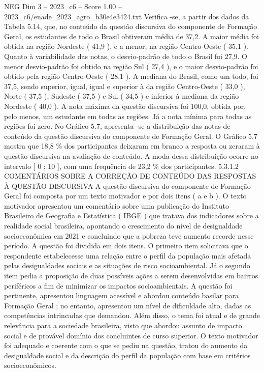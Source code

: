 \begin{textsample}{NEG Dim 3 – 2023\_c6 – Score 1.00 – 2023\_c6/enade\_2023\_agro\_b30e4e3424.txt}
Verifica -se, a partir dos dados da Tabela 5.14, que, no conteúdo da questão discursiva do componente de Formação Geral, os estudantes de todo o Brasil obtiveram média de 37,2.
A maior média foi obtida na região Nordeste ( 41,9 ), e a menor, na região Centro-Oeste ( 35,1 ).
Quanto à variabilidade das notas, o desvio-padrão de todo o Brasil foi 27,9.
O menor desvio-padrão foi obtido na região Sul ( 27,4 ), e o maior desvio-padrão foi obtido pela região Centro-Oeste ( 28,1 ).
A mediana do Brasil, como um todo, foi 37,5, sendo superior, igual, igual e superior à da região Centro-Oeste ( 33,0 ), Norte ( 37,5 ), Sudeste ( 37,5 ) e Sul ( 34,5 ) e inferior à mediana da região Nordeste ( 40,0 ).
A nota máxima da questão discursiva foi 100,0, obtida por, pelo menos, um estudante em todas as regiões.
Já a nota mínima para todas as regiões foi zero.
No Gráfico 5.7, apresenta -se a distribuição das notas de conteúdo da questão discursiva do componente de Formação Geral.
O Gráfico 5.7 mostra que 18,8 \% dos participantes deixaram em branco a resposta ou zeraram à questão discursiva na avaliação de conteúdo.
A moda dessa distribuição ocorre no intervalo [ 0 ; 10 ], com uma frequência de 23,2 \% dos participantes. 5.3.1.2 COMENTÁRIOS SOBRE A CORREÇÃO DE CONTEÚDO DAS RESPOSTAS À QUESTÃO DISCURSIVA A questão discursiva do componente de Formação Geral foi composta por um texto motivador e por dois itens ( a e b ).
O texto motivador apresentou um comentário sobre uma publicação do Instituto Brasileiro de Geografia e Estatística ( IBGE ) que tratava dos indicadores sobre a realidade social brasileira, apontando o crescimento do nível de desigualdade socioeconômica em 2021 e concluindo que a pobreza teve aumento recorde nesse período.
A questão foi dividida em dois itens.
O primeiro item solicitava que o respondente estabelecesse uma relação entre o perfil da população mais afetada pelas desigualdades sociais e as situações de risco socioambiental.
Já o segundo item pedia a proposição de duas possíveis ações a serem desenvolvidas em bairros periféricos a fim de minimizar os impactos socioambientais.
A questão foi pertinente, apresentou linguagem acessível e abordou conteúdo basilar para Formação Geral ; no entanto, apresentou um nível de dificuldade alto, dadas as competências intrincadas que demandou.
Além disso, o tema foi atual e de grande relevância para a sociedade brasileira, visto que abordou assunto de impacto social e de provável domínio dos concluintes de curso superior.
O texto motivador foi adequado e coerente com o que se pediu na questão, tratou do aumento da desigualdade social e da descrição do perfil da população com base em critérios socioeconômicos.

\end{textsample}
